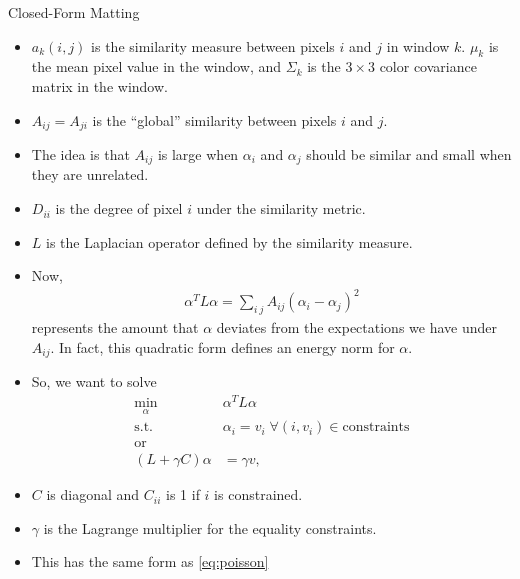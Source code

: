 \documentclass{beamer}
\begin{document}
\begin{frame}[allowframebreaks]{Closed-Form Matting \cite{levin2008closed}}
\begin{itemize}
  \item $a_k(i,j)$ is the similarity measure between pixels $i$ and $j$ in
        window $k$. $\mu_k$ is the mean pixel value in the window, and $\Sigma_k$
        is the $3 \times 3$ color covariance matrix in the window.
  \item $A_{ij} = A_{ji}$ is the ``global'' similarity between pixels $i$ and $j$.
  \item The idea is that $A_{ij}$ is large when $\alpha_i$ and $\alpha_j$ should be
        similar and small when they are unrelated.
  \item $D_{ii}$ is the degree of pixel $i$ under the similarity metric.
  \item $L$ is the Laplacian operator defined by the similarity measure.
  \item Now,
   \begin{align}
    \alpha^T L \alpha = \sum_{i~j} A_{ij}(\alpha_i-\alpha_j)^2
   \end{align}
   represents the amount that $\alpha$ deviates from the expectations we have
   under $A_{ij}$. In fact, this quadratic form defines an energy norm for $\alpha$.
  \item So, we want to solve
   \begin{align}
    \min_\alpha \; &\alpha^TL\alpha \\
    \text{s.t.} \; &\alpha_i = v_i \; \forall (i,v_i) \in \text{constraints} \nonumber \\
    \text{or} \nonumber \\
    (L + \gamma C) \alpha &= \gamma v,
   \end{align}
  \item $C$ is diagonal and $C_{ii}$ is 1 if $i$ is constrained.
  \item $\gamma$ is the Lagrange multiplier for the equality constraints.
  \item This has the same form as \eqref{eq:poisson}
 \end{itemize}
\end{frame}
\end{document}
